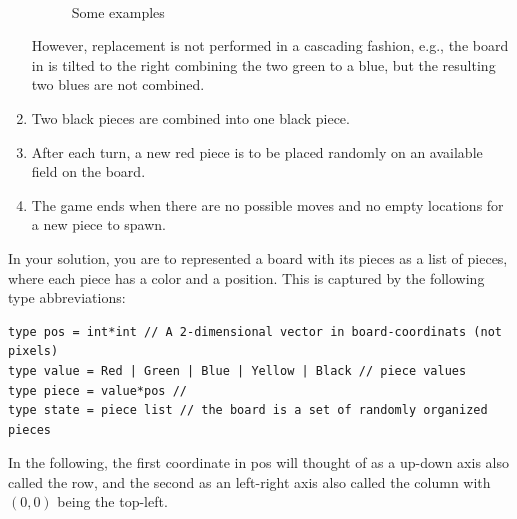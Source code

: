 \begin{enumerate}
\begin{figure}
    \\
    \caption{Some examples}
    \label{fig:2048Samples}
  \end{figure}
However, replacement is not performed in a cascading fashion, e.g., the board in  is tilted to the right combining the two green to a blue, but the resulting two blues are not combined.
\item Two black pieces are combined into one black piece.
\item After each turn, a new red piece is to be placed randomly on an available field on the board.
\item The game ends when there are no possible moves and no empty locations for a new piece to spawn.
\end{enumerate}
In your solution, you are to represented a board with its pieces as a list of pieces, where each piece has a color and a position. This is captured by the following type abbreviations:
\begin{lstlisting}
type pos = int*int // A 2-dimensional vector in board-coordinats (not pixels)
type value = Red | Green | Blue | Yellow | Black // piece values
type piece = value*pos //
type state = piece list // the board is a set of randomly organized pieces
\end{lstlisting}
In the following, the first coordinate in pos will thought of as a up-down axis also called the row, and the second as an left-right axis also called the column with $(0,0)$ being the top-left.